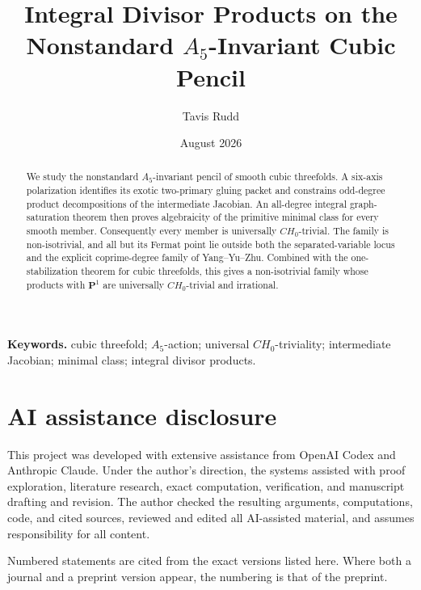 \documentclass[11pt]{article}
\title{Integral Divisor Products on the Nonstandard \(A_5\)-Invariant Cubic Pencil}
\author{Tavis Rudd}
\date{August 2026}
\numberwithin{equation}{section}
\theoremstyle{definition}
\theoremstyle{remark}
\newcommand{\PP}{\mathbf P}
\begin{document}
\maketitle

\begin{abstract}
We study the nonstandard \(A_5\)-invariant pencil of smooth cubic
threefolds.  A six-axis polarization identifies its exotic two-primary
gluing packet and constrains odd-degree product decompositions of the
intermediate Jacobian.  An all-degree integral graph-saturation theorem then
proves algebraicity of the primitive minimal class for every smooth member.
Consequently every member is universally \(CH_0\)-trivial.  The family is
non-isotrivial, and all but its Fermat point lie outside both the
separated-variable locus and the explicit coprime-degree family of
Yang--Yu--Zhu.  Combined with the one-stabilization theorem for cubic
threefolds, this gives a non-isotrivial family whose products with
\(\PP^1\) are universally \(CH_0\)-trivial and irrational.
\end{abstract}

\noindent\textbf{Keywords.} cubic threefold; \(A_5\)-action; universal
\(CH_0\)-triviality; intermediate Jacobian; minimal class; integral divisor
products.






\section*{AI assistance disclosure}

This project was developed with extensive assistance from OpenAI Codex and
Anthropic Claude. Under the author's direction, the systems assisted with
proof exploration, literature research, exact computation, verification,
and manuscript drafting and revision. The author checked the resulting
arguments, computations, code, and cited sources, reviewed and edited all
AI-assisted material, and assumes responsibility for all content.

\footnotesize
\noindent Numbered statements are cited from the exact versions listed here.
Where both a journal and a preprint version appear, the numbering is that of
the preprint.
\end{document}
